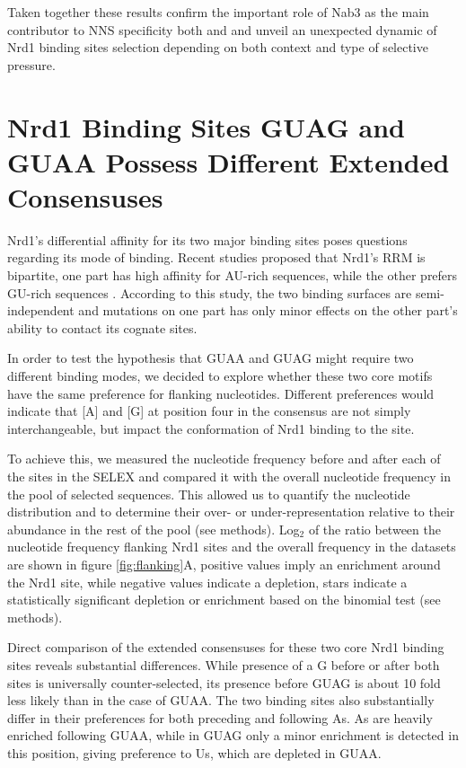 Taken together these results confirm the important role of Nab3 as the main contributor to NNS specificity both \invivo{} and \invitro{} and unveil an unexpected dynamic of Nrd1 binding sites selection depending on both context and type of selective pressure.

\singlespacing
\section{Nrd1 Binding Sites GUAG and GUAA Possess Different Extended Consensuses}
\doublespacing

Nrd1’s differential affinity for its two major binding sites poses questions regarding its mode of binding. Recent studies proposed that Nrd1’s RRM is bipartite, one part has high affinity for AU-rich sequences, while the other prefers GU-rich sequences \cite{bacikova:2014:structure}. According to this study, the two binding surfaces are semi-independent and mutations on one part has only minor effects on the other part’s ability to contact its cognate sites. 

In order to test the hypothesis that GUAA and GUAG might require two different binding modes, we decided to explore whether these two core motifs have the same preference for flanking nucleotides. Different preferences would indicate that [A] and [G] at position four in the consensus are not simply interchangeable, but impact the conformation of Nrd1 binding to the site.

To achieve this, we measured the nucleotide frequency before and after each of the sites in the SELEX and compared it with the overall nucleotide frequency in the pool of selected sequences. 
This allowed us to quantify the nucleotide distribution and to determine their over- or under-representation relative to their abundance in the rest of the pool (see methods).
Log$_2$ of the ratio between the nucleotide frequency flanking Nrd1 sites and the overall frequency in the datasets are shown in figure \ref{fig:flanking}A, positive values imply an enrichment around the Nrd1 site, while negative values indicate a depletion, stars indicate a statistically significant depletion or enrichment based on the binomial test (see methods).

Direct comparison of the extended consensuses for these two core Nrd1 binding sites reveals substantial differences. While presence of a G before or after both sites is universally counter-selected, its presence before GUAG is about 10 fold less likely than in the case of GUAA. The two binding sites also substantially differ in their preferences for both preceding and following As. As are heavily enriched following GUAA, while in GUAG only a minor enrichment is detected in this position, giving preference to Us, which are depleted in GUAA. 

